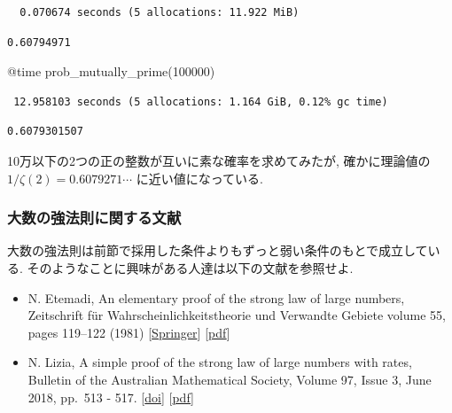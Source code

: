 \documentclass[
  letterpaper,
  DIV=11,
  numbers=noendperiod]{scrartcl}
\newenvironment{Shaded}{\begin{snugshade}}{\end{snugshade}}
\newcommand{\FloatTok}[1]{\textcolor[rgb]{0.68,0.00,0.00}{#1}}
\newcommand{\FunctionTok}[1]{\textcolor[rgb]{0.28,0.35,0.67}{#1}}
\newcommand{\NormalTok}[1]{\textcolor[rgb]{0.00,0.23,0.31}{#1}}
\newcommand{\PreprocessorTok}[1]{\textcolor[rgb]{0.68,0.00,0.00}{#1}}
\begin{document}
\begin{verbatim}
  0.070674 seconds (5 allocations: 11.922 MiB)
\end{verbatim}

\begin{verbatim}
0.60794971
\end{verbatim}

\begin{Shaded}
\begin{Highlighting}[]
\PreprocessorTok{@time} \FunctionTok{prob\_mutually\_prime}\NormalTok{(}\FloatTok{100000}\NormalTok{)}
\end{Highlighting}
\end{Shaded}

\begin{verbatim}
 12.958103 seconds (5 allocations: 1.164 GiB, 0.12% gc time)
\end{verbatim}

\begin{verbatim}
0.6079301507
\end{verbatim}

10万以下の2つの正の整数が互いに素な確率を求めてみたが, 確かに理論値の
\(1/\zeta(2) = 0.6079271{\cdots}\) に近い値になっている.

\hypertarget{ux5927ux6570ux306eux5f37ux6cd5ux5247ux306bux95a2ux3059ux308bux6587ux732e}{%
\subsubsection{大数の強法則に関する文献}\label{ux5927ux6570ux306eux5f37ux6cd5ux5247ux306bux95a2ux3059ux308bux6587ux732e}}

大数の強法則は前節で採用した条件よりもずっと弱い条件のもとで成立している.
そのようなことに興味がある人達は以下の文献を参照せよ.

\begin{itemize}
\item
  N. Etemadi, An elementary proof of the strong law of large numbers,
  Zeitschrift für Wahrscheinlichkeitstheorie und Verwandte Gebiete
  volume 55, pages 119--122 (1981)
  {[}\href{https://link.springer.com/article/10.1007/BF01013465\#citeas}{Springer}{]}
  {[}\href{https://people.math.umass.edu/~yaoli/ptrl.pdf}{pdf}{]}
\item
  N. Lizia, A simple proof of the strong law of large numbers with
  rates, Bulletin of the Australian Mathematical Society, Volume 97,
  Issue 3, June 2018, pp.~513 - 517.
  {[}\href{https://doi.org/10.1017/S0004972718000059}{doi}{]}
  {[}\href{http://www.im.ufrj.br/nuno/SLLN.pdf}{pdf}{]}
\end{itemize}
\end{document}
